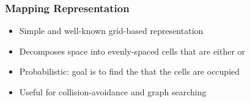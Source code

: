 \documentclass[11pt,professionalfonts,hyperref={pdftex,pdfpagemode=none,pdfstartview=FitH}]{beamer}
\renewcommand{\emph}[1]{\textit{\textbf{\color{blue}{#1}}}}
\begin{document}
\begin{frame}
\frametitle{Mapping Representation}
    \begin{itemize}
    	\item Simple and well-known grid-based representation
	\pause
	\item Decomposes space into evenly-spaced cells that are either \emph{occupied} or \emph{free}
	\pause
    	\item Probabilistic: goal is to find the \emph{probability} that the cells are occupied
	\pause
	\item Useful for collision-avoidance and graph searching
    \end{itemize}
    

\end{frame}
\end{document}
